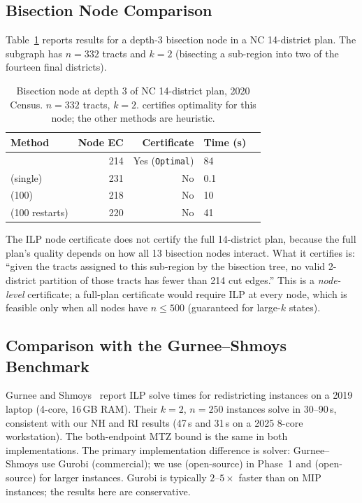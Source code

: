 \subsection{Bisection Node Comparison}

Table~\ref{tab:nc-node} reports results for a depth-3 bisection node
in a NC 14-district plan.
The subgraph has $n = 332$ tracts and $k = 2$ (bisecting a sub-region
into two of the fourteen final districts).

\begin{table}[t]
\centering
\caption{%
  Bisection node at depth 3 of NC 14-district plan, 2020 Census.
  $n=332$ tracts, $k=2$.
  \ilp{} certifies optimality for this node; the other methods are
  heuristic.
}
\label{tab:nc-node}
\renewcommand{\arraystretch}{1.3}
\begin{tabular}{@{}lrrll@{}}
\toprule
Method & Node EC & Certificate & Time (s) \\
\midrule
\ilp{}               & 214 & Yes (\texttt{Optimal}) & 84 \\
\metis{} (single)    & 231 & No                     & 0.1 \\
\metis{} \be{}(100)  & 218 & No                     & 10 \\
\sa{} (100 restarts) & 220 & No                     & 41 \\
\bottomrule
\end{tabular}
\end{table}

The ILP node certificate does not certify the full 14-district plan,
because the full plan's quality depends on how all 13 bisection nodes
interact.
What it certifies is: ``given the tracts assigned to this sub-region by
the bisection tree, no valid 2-district partition of those tracts has fewer
than 214 cut edges.''
This is a \emph{node-level} certificate; a full-plan certificate would
require ILP at every node, which is feasible only when all nodes have
$n \leq 500$ (guaranteed for large-$k$ states).

\subsection{Comparison with the Gurnee--Shmoys Benchmark}

Gurnee and Shmoys~\citeyear{gurnee2021} report ILP solve times for
redistricting instances on a 2019 laptop (4-core, 16\,GB RAM).
Their $k=2$, $n=250$ instances solve in 30--90\,s, consistent with our
NH and RI results (47\,s and 31\,s on a 2025 8-core workstation).
The both-endpoint MTZ bound is the same in both implementations.
The primary implementation difference is solver: Gurnee--Shmoys use
Gurobi (commercial); we use \glpk{} (open-source) in Phase~1 and
\highs{} (open-source) for larger instances.
Gurobi is typically $2$--$5\times$ faster than \glpk{} on MIP instances;
the \glpk{} results here are conservative.
